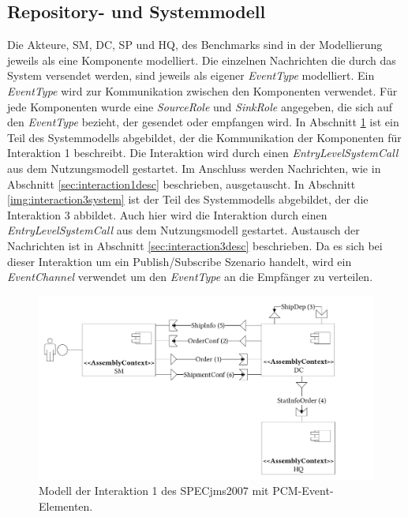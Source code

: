 \subsection{Repository- und Systemmodell}
Die Akteure, SM, DC, SP und HQ, des Benchmarks sind in der Modellierung jeweils als eine Komponente modelliert. Die einzelnen Nachrichten die durch das System versendet werden, sind jeweils als eigener \emph{EventType} modelliert. Ein \emph{EventType} wird zur Kommunikation zwischen den Komponenten verwendet. Für jede Komponenten wurde eine \emph{SourceRole} und \emph{SinkRole} angegeben, die sich auf den \emph{EventType} bezieht, der gesendet oder empfangen wird. In Abschnitt \ref{img:interaction1system} ist ein Teil des Systemmodells abgebildet, der die Kommunikation der Komponenten für Interaktion 1 beschreibt. Die Interaktion wird durch einen \emph{EntryLevelSystemCall} aus dem Nutzungsmodell gestartet. Im Anschluss werden Nachrichten, wie in Abschnitt \ref{sec:interaction1desc} beschrieben, ausgetauscht. In Abschnitt \ref{img:interaction3system} ist der Teil des Systemmodells abgebildet, der die Interaktion 3 abbildet. Auch hier wird die Interaktion durch einen \emph{EntryLevelSystemCall} aus dem Nutzungsmodell gestartet. Austausch der Nachrichten ist in Abschnitt \ref{sec:interaction3desc} beschrieben. Da es sich bei dieser Interaktion um ein Publish/Subscribe Szenario handelt, wird ein \emph{EventChannel} verwendet um den \emph{EventType} an die Empfänger zu verteilen.

\begin{figure}
\center
  \includegraphics[width=1\textwidth]{images/evaluation/specjms/evaluationInteraktion1events.pdf}
  \caption{Modell der Interaktion 1 des SPECjms2007 mit PCM-Event-Elementen.}
  \label{img:interaction1system}
\end{figure}

